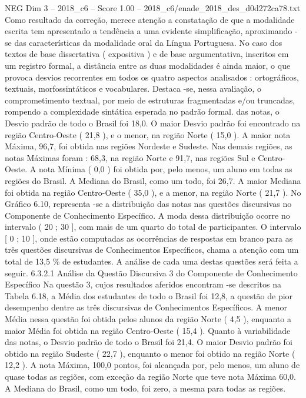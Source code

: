 \begin{textsample}{NEG Dim 3 – 2018\_c6 – Score 1.00 – 2018\_c6/enade\_2018\_des\_d0d272ca78.txt}
Como resultado da correção, merece atenção a constatação de que a modalidade escrita tem apresentado a tendência a uma evidente simplificação, aproximando -se das características da modalidade oral da Língua Portuguesa.
No caso dos textos de base dissertativa ( expositiva ) e de base argumentativa, inscritos em um registro formal, a distância entre as duas modalidades é ainda maior, o que provoca desvios recorrentes em todos os quatro aspectos analisados : ortográficos, textuais, morfossintáticos e vocabulares.
Destaca -se, nessa avaliação, o comprometimento textual, por meio de estruturas fragmentadas e/ou truncadas, rompendo a complexidade sintática esperada no padrão formal. das notas, o Desvio padrão de todo o Brasil foi 18,0.
O maior Desvio padrão foi encontrado na região Centro-Oeste ( 21,8 ), e o menor, na região Norte ( 15,0 ).
A maior nota Máxima, 96,7, foi obtida nas regiões Nordeste e Sudeste.
Nas demais regiões, as notas Máximas foram : 68,3, na região Norte e 91,7, nas regiões Sul e Centro-Oeste.
A nota Mínima ( 0,0 ) foi obtida por, pelo menos, um aluno em todas as regiões do Brasil.
A Mediana do Brasil, como um todo, foi 26,7.
A maior Mediana foi obtida na região Centro-Oeste ( 35,0 ), e a menor, na região Norte ( 21,7 ).
No Gráfico 6.10, representa -se a distribuição das notas nas questões discursivas no Componente de Conhecimento Específico.
A moda dessa distribuição ocorre no intervalo ( 20 ; 30 ], com mais de um quarto do total de participantes.
O intervalo [ 0 ; 10 ], onde estão computadas as ocorrências de respostas em branco para as três questões discursivas de Conhecimentos Específicos, chama a atenção com um total de 13,5 \% de estudantes.
A análise de cada uma destas questões será feita a seguir. 6.3.2.1 Análise da Questão Discursiva 3 do Componente de Conhecimento Específico Na questão 3, cujos resultados aferidos encontram -se descritos na Tabela 6.18, a Média dos estudantes de todo o Brasil foi 12,8, a questão de pior desempenho dentre as três discursivas de Conhecimentos Específicos.
A menor Média nessa questão foi obtida pelos alunos da região Norte ( 4,5 ), enquanto a maior Média foi obtida na região Centro-Oeste ( 15,4 ).
Quanto à variabilidade das notas, o Desvio padrão de todo o Brasil foi 21,4.
O maior Desvio padrão foi obtido na região Sudeste ( 22,7 ), enquanto o menor foi obtido na região Norte ( 12,2 ).
A nota Máxima, 100,0 pontos, foi alcançada por, pelo menos, um aluno de quase todas as regiões, com exceção da região Norte que teve nota Máxima 60,0.
A Mediana do Brasil, como um todo, foi zero, a mesma para todas as regiões.

\end{textsample}
